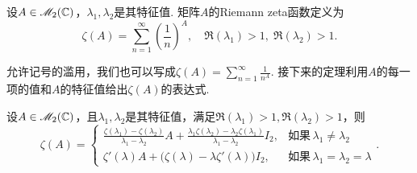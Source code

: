\begin{mybox}
  \begin{definition}

   设$A\in\mathscr M_2(\mathbb C)$，$\lambda_1,\lambda_2$是其特征值. 矩阵$A$的{\kaishu Riemann zeta函数}定义为
   \[
     \zeta(A) = \sum_{n=1}^\infty \left(\frac1n\right)^A,\quad \Re(\lambda_1)>1,\;\Re(\lambda_2)>1.
   \]
  \end{definition}
\end{mybox}

允许记号的滥用，我们也可以写成$\zeta(A)=\sum_{n=1}^\infty\frac1{n^A}$. 接下来的定理利用$A$的每一项的值和$A$的特征值给出$\zeta(A)$的表达式.

\begin{mybox}
  \begin{theorem}
    设$A\in\mathscr M_2(\mathbb C)$，且$\lambda_1,\lambda_2$是其特征值，满足$\Re(\lambda_1)>1,\Re(\lambda_2)>1$，则
    \[
      \zeta(A) = \begin{cases}
        \frac{\zeta(\lambda_1)-\zeta(\lambda_2)}{
        \lambda_1-\lambda_2}A + \frac{\lambda_1\zeta(\lambda_2)-\lambda_2\zeta
        (\lambda_1)}{\lambda_1-\lambda_2}I_2, & \text{如果}\, \lambda_1 \ne \lambda_2 \\
        \zeta'(\lambda)A + \big(\zeta(\lambda)-\lambda\zeta'(\lambda)\big)
        I_2, & \text{如果}\, \lambda_1=\lambda_2=\lambda
      \end{cases}.
    \]
  \end{theorem}
\end{mybox}
